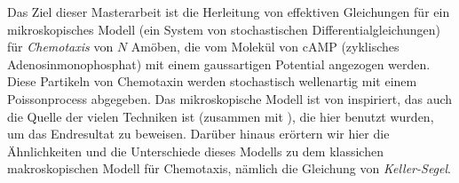 Das Ziel dieser Masterarbeit ist die Herleitung von effektiven Gleichungen für ein mikroskopisches Modell (ein System von stochastischen Differentialgleichungen) für \emph{Chemotaxis} von $N$ Amöben, die vom Molekül von cAMP (zyklisches Adenosinmonophosphat) mit einem gaussartigen Potential angezogen werden.
Diese Partikeln von Chemotaxin werden stochastisch wellenartig mit einem Poissonprocess abgegeben.
Das mikroskopische Modell ist von \cite{ana} inspiriert, das auch die Quelle der vielen Techniken ist (zusammen mit \cite{peter-boers}), die hier benutzt wurden, um das Endresultat zu beweisen.
Darüber hinaus erörtern wir hier die Ähnlichkeiten und die Unterschiede dieses Modells zu dem klassichen makroskopischen Modell für Chemotaxis, nämlich die Gleichung von \emph{Keller-Segel}.